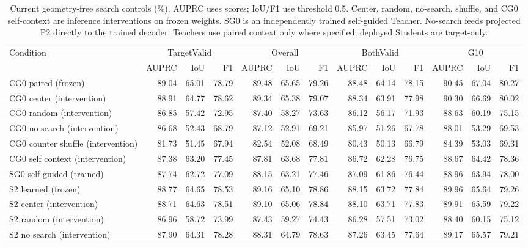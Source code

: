 \begin{table}[!t]
\caption{Current geometry-free search controls (\%). AUPRC uses scores; IoU/F1 use threshold 0.5. Center, random, no-search, shuffle, and CG0 self-context are inference interventions on frozen weights. SG0 is an independently trained self-guided Teacher. No-search feeds projected P2 directly to the trained decoder. Teachers use paired context only where specified; deployed Students are target-only.}
\label{tab:search_intervention}
\centering\scriptsize
\setlength{\tabcolsep}{3pt}
\begin{tabular}{lrrrrrrrrrrrr}
\toprule
Condition & \multicolumn{3}{c}{TargetValid} & \multicolumn{3}{c}{Overall} & \multicolumn{3}{c}{BothValid} & \multicolumn{3}{c}{G10}\\
 & AUPRC & IoU & F1 & AUPRC & IoU & F1 & AUPRC & IoU & F1 & AUPRC & IoU & F1\\
\midrule
CG0 paired (frozen) & 89.04 & 65.01 & 78.79 & 89.48 & 65.65 & 79.26 & 88.48 & 64.14 & 78.15 & 90.45 & 67.04 & 80.27\\
CG0 center (intervention) & 88.91 & 64.77 & 78.62 & 89.34 & 65.38 & 79.07 & 88.34 & 63.91 & 77.98 & 90.30 & 66.69 & 80.02\\
CG0 random (intervention) & 86.85 & 57.42 & 72.95 & 87.40 & 58.27 & 73.63 & 86.12 & 56.17 & 71.93 & 88.63 & 60.19 & 75.15\\
CG0 no search (intervention) & 86.68 & 52.43 & 68.79 & 87.12 & 52.91 & 69.21 & 85.97 & 51.26 & 67.78 & 88.01 & 53.29 & 69.53\\
CG0 counter shuffle (intervention) & 81.73 & 51.45 & 67.94 & 82.54 & 52.08 & 68.49 & 80.43 & 50.13 & 66.79 & 84.39 & 53.03 & 69.31\\
CG0 self context (intervention) & 87.38 & 63.20 & 77.45 & 87.81 & 63.68 & 77.81 & 86.72 & 62.28 & 76.75 & 88.67 & 64.42 & 78.36\\
SG0 self guided (trained) & 87.74 & 62.72 & 77.09 & 88.15 & 63.21 & 77.46 & 87.09 & 61.86 & 76.44 & 88.96 & 63.94 & 78.00\\
S2 learned (frozen) & 88.77 & 64.65 & 78.53 & 89.16 & 65.10 & 78.86 & 88.15 & 63.72 & 77.84 & 89.96 & 65.64 & 79.26\\
S2 center (intervention) & 88.71 & 64.63 & 78.51 & 89.10 & 65.06 & 78.84 & 88.10 & 63.71 & 77.83 & 89.91 & 65.59 & 79.22\\
S2 random (intervention) & 86.96 & 58.72 & 73.99 & 87.43 & 59.27 & 74.43 & 86.28 & 57.51 & 73.02 & 88.40 & 60.15 & 75.12\\
S2 no search (intervention) & 87.90 & 64.31 & 78.28 & 88.31 & 64.79 & 78.63 & 87.26 & 63.45 & 77.64 & 89.17 & 65.57 & 79.21\\
\bottomrule
\end{tabular}
\end{table}
